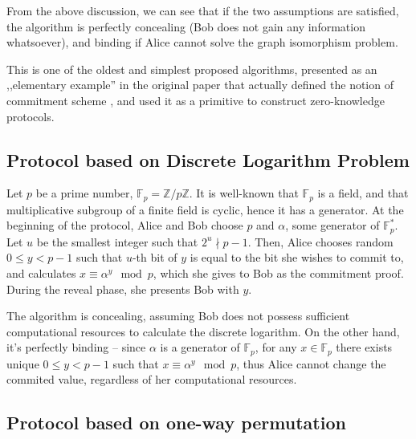 \documentclass[10pt]{article}
\begin{document}
From the above discussion, we can see that if the two assumptions are satisfied, the algorithm is
perfectly concealing (Bob does not gain any information whatsoever), and binding if Alice cannot solve
the graph isomorphism problem.

This is one of the oldest and simplest proposed algorithms, presented as an ,,elementary example'' 
in the original paper that actually defined the notion of commitment scheme \cite{Brassard88}, and 
used it as a primitive to construct zero-knowledge protocols.

\subsection*{Protocol based on Discrete Logarithm Problem}

Let \(p\) be a prime number, \(\mathbb{F}_p=\mathbb{Z}/p\mathbb{Z}\). It is well-known that 
\(\mathbb{F}_p\) is a field, and that multiplicative subgroup of a finite field is cyclic, hence it
has a generator. At the beginning of the protocol, Alice and Bob choose \(p\) and \(\alpha\), some
generator of \(\mathbb{F}^*_p\). Let \(u\) be the smallest integer such that \(2^u \nmid p-1\). 
Then, Alice chooses random \(0\leq y < p-1\) such that \(u\)-th bit of \(y\) is equal to the bit
she wishes to commit to\footnotemark, and calculates \(x\equiv \alpha^y \mod p\), which she gives
to Bob as the commitment proof. During the reveal phase, she presents Bob with \(y\).

The algorithm is concealing, assuming Bob does not possess sufficient computational resources to
calculate the discrete logarithm. On the other hand, it's perfectly binding -- since \(\alpha\) is
a generator of \(\mathbb{F}_p\), for any \(x\in\mathbb{F}_p\) there exists unique \(0\leq y < p-1\)
such that \(x\equiv \alpha^y \mod p\), thus Alice cannot change the commited value, regardless
of her computational resources.




\subsection*{Protocol based on one-way permutation} 
\end{document}
